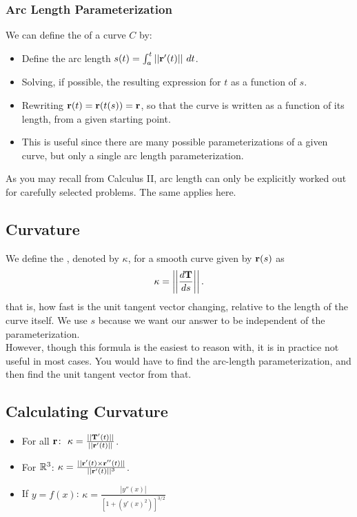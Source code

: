 \subsubsection{Arc Length Parameterization} 

We can define the  of a curve \(C\) by:
\begin{itemize}
    \item Define the arc length \(s(t) = \int_{a}^{t}||\mathbf{r}'(t)|| \ dt\).
    \item Solving, if possible, the resulting expression for \(t\) as a function of \(s\).
    \item Rewriting \(\mathbf{r}(t) = \mathbf{r}(t(s)) = \mathbf{r}\), so that the curve is written as a function of its length, from a given starting point.
    \item This is useful since there are many possible parameterizations of a given curve, but only a single arc length parameterization.
\end{itemize}
As you may recall from Calculus II, arc length can only be explicitly worked out for carefully selected problems. The same applies here.

\subsection{Curvature}

We define the , denoted by \(\kappa\), for a smooth curve given by \(\mathbf{r}(s)\) as 
\[
    \kappa = \left|\left|\frac{d\mathbf{T}}{ds}\right|\right|.
\]
that is, how fast is the unit tangent vector changing, relative to the length of the curve itself. We use \(s\) because we want our answer to be independent of the parameterization. \\

However, though this formula is the easiest to reason with, it is in practice not useful in most cases. You would have to find the arc-length parameterization, and then find the unit tangent vector from that.  

\subsection{Calculating Curvature}

\begin{itemize}
    \item For all \(\mathbf{r} \colon \ \kappa = \frac{||\mathbf{T}'(t)||}{||\mathbf{r}'(t)||}\).
    \item For \(\mathbb{R}^{3}\): \(\kappa = \frac{||\mathbf{r}'(t) \times \mathbf{r}''(t)||}{||\mathbf{r}'(t)||^{3}}\).
    \item If \(y = f(x)\): \(\kappa = \frac{|y''(x)|}{[1 + (y'(x)^{2})]^{3/2}}\)
\end{itemize}

